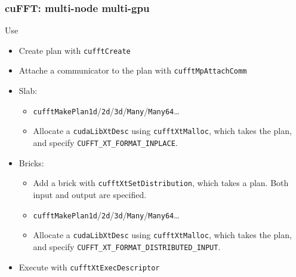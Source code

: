 \documentclass[10pt,aspectratio=169]{beamer}
\begin{document}
\begin{frame}[fragile]
  \frametitle{cuFFT: multi-node multi-gpu}

  \begin{center}Use\end{center}


    \begin{itemize}
    \item Create plan with \lstinline{cufftCreate}
    \item Attache a communicator to the plan with \lstinline{cufftMpAttachComm}
    \item Slab:
      \begin{itemize}
      \item \lstinline{cufftMakePlan1d}/\lstinline{2d}/\lstinline{3d}/\lstinline{Many}/\lstinline{Many64}\dots{}
      \item Allocate a \lstinline{cudaLibXtDesc} using
        \lstinline{cufftXtMalloc}, which takes the plan, and specify \lstinline{CUFFT_XT_FORMAT_INPLACE}.
      \end{itemize}
    \item Bricks:
      \begin{itemize}
      \item Add a brick with \lstinline{cufftXtSetDistribution}, which takes a plan.  Both input and output are specified.
      \item \lstinline{cufftMakePlan1d}/\lstinline{2d}/\lstinline{3d}/\lstinline{Many}/\lstinline{Many64}\dots{}
      \item Allocate a \lstinline{cudaLibXtDesc} using
        \lstinline{cufftXtMalloc}, which takes the plan, and specify \lstinline{CUFFT_XT_FORMAT_DISTRIBUTED_INPUT}.
      \end{itemize}
    \item Execute with \lstinline{cufftXtExecDescriptor}
    \end{itemize}

    
    
\end{frame}
\end{document}
